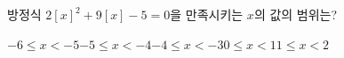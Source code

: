 방정식 $2[x]^2+9[x]-5=0$을 만족시키는 $x$의 값의 범위는? 
\begin{choicesii}{$-6\le x<-5$}{$-5\le x<-4$}{$-4\le x<-3$}{$0\le x<1$}{$1\le x<2$}\end{choicesii}
